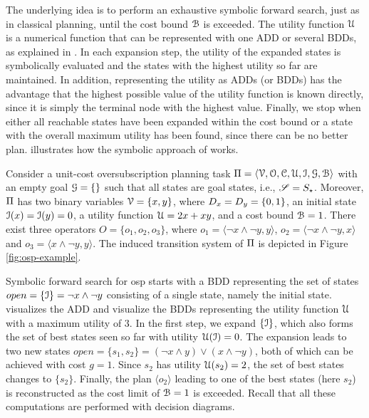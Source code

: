 The underlying idea is to perform an exhaustive symbolic forward search, just as in classical planning, until the cost bound $\mathcal B$ is exceeded.
The utility function $\mathcal U$ is a numerical function that can be represented with one ADD or several BDDs, as explained in .
In each expansion step, the utility of the expanded states is symbolically evaluated and the states with the highest utility so far are maintained.
In addition, representing the utility as ADDs (or BDDs) has the advantage that the highest possible value of the utility function is known directly, since it is simply the terminal node with the highest value.
Finally, we stop when either all reachable states have been expanded within the cost bound or a state with the overall maximum utility has been found, since there can be no better plan.
 illustrates how the symbolic approach of \textcite{speck-katz-aaai2021} works.

\begin{example}\label{ex:osp-algorithm}
    Consider a unit-cost oversubscription planning task $\Pi = \langle \mathcal V, \mathcal O, \mathcal C, \mathcal U, \mathcal I, \mathcal G, \mathcal B \rangle$ with an empty goal $\mathcal G = \{\}$ such that all states are goal states, i.e., $\mathscr S = S_\star$.
    Moreover, $\Pi$ has two binary variables $\mathcal V = \{x,y\}$, where $D_x = D_y = \{0,1\}$, an initial state $\mathcal I(x) = \mathcal I(y) = 0$, a utility function $\mathcal U = 2x + xy$, and a cost bound $\mathcal B = 1$.
    There exist three operators $O = \{o_1,o_2,o_3\}$, where $o_1 = \langle \lnot x \land \lnot y, y \rangle$, $o_2 = \langle \lnot x \land \lnot y, x \rangle$ and $o_3 = \langle x \land \lnot y, y \rangle$.
    The induced transition system of $\Pi$ is depicted in Figure \ref{fig:osp-example}.

    Symbolic forward search for osp \autocite{speck-katz-aaai2021} starts with a BDD representing the set of states $open = \{\mathcal I\}= \lnot x \land \lnot y$ consisting of a single state, namely the initial state.
     visualizes the ADD and  visualize the BDDs representing the utility function $\mathcal U$ with a maximum utility of $3$.
    In the first step, we expand $\{\mathcal I\}$, which also forms the set of best states seen so far with utility $\mathcal U(\mathcal I) = 0$.
    The expansion leads to two new states $open = \{s_1,s_2\} = (\lnot x \land y) \lor (x \land \lnot y)$, both of which can be achieved with cost $g = 1$.
    Since $s_2$ has utility $\mathcal U(s_2) = 2$, the set of best states changes to $\{ s_2 \}$.
    Finally, the plan $\langle o_2 \rangle$ leading to one of the best states (here $s_2$) is reconstructed as the cost limit of $\mathcal B = 1$ is exceeded.
    Recall that all these computations are performed with decision diagrams.
\end{example}

